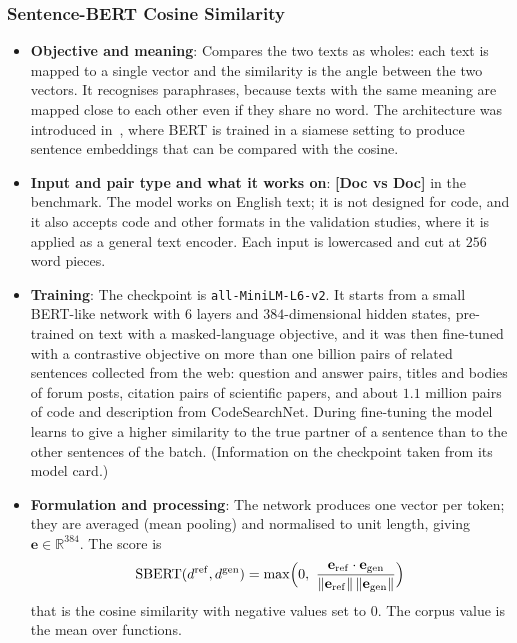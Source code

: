 \subsubsection{Sentence-BERT Cosine Similarity}
\label{subsubsec:sbert}
\begin{itemize}[leftmargin=*, label=\textbullet]
	\item \textbf{Objective and meaning}: Compares the two texts as wholes: each text is mapped to a
	single vector and the similarity is the angle between the two vectors. It recognises paraphrases,
	because texts with the same meaning are mapped close to each other even if they share no word.
	The architecture was introduced in~\cite{reimers_sentence-bert_2019}, where BERT is trained in a
	siamese setting to produce sentence embeddings that can be compared with the cosine.

	\item \textbf{Input and pair type and what it works on}: \textbf{[Doc vs Doc]} in the
	benchmark. The model works on English text; it is not designed for code, and it also accepts
	code and other formats in the validation studies, where it is applied as a general text encoder.
	Each input is lowercased and cut at $256$ word pieces.

	\item \textbf{Training}: The checkpoint is \texttt{all-MiniLM-L6-v2}. It starts from a small
	BERT-like network with $6$ layers and $384$-dimensional hidden states, pre-trained on text with
	a masked-language objective, and it was then fine-tuned with a contrastive objective on more than
	one billion pairs of related sentences collected from the web: question and answer pairs, titles
	and bodies of forum posts, citation pairs of scientific papers, and about $1.1$ million pairs
	of code and description from CodeSearchNet. During fine-tuning the model learns to give a
	higher similarity to the true partner of a sentence than to the other sentences of the batch.
	(Information on the checkpoint taken from its model card.)

	\item \textbf{Formulation and processing}: The network produces one vector per token; they are
	averaged (mean pooling) and normalised to unit length, giving $\mathbf{e}\in\mathbb{R}^{384}$.
	The score is
	\begin{equation}
		\mathrm{SBERT}(d^{\mathrm{ref}},d^{\mathrm{gen}}) =
		\max\Bigl(0,\ \frac{\mathbf{e}_{\mathrm{ref}}\cdot\mathbf{e}_{\mathrm{gen}}}
		{\|\mathbf{e}_{\mathrm{ref}}\|\,\|\mathbf{e}_{\mathrm{gen}}\|}\Bigr)
		\label{eq:sbert}
	\end{equation}
	that is the cosine similarity with negative values set to $0$. The corpus value is the mean over
	functions.


\end{itemize}
